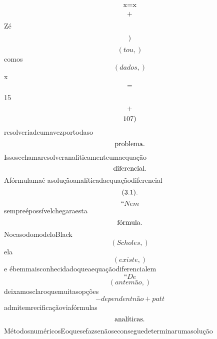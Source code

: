 \documentclass{article}
\begin{document}
\begin{equation}
$x=x$
\end{equation}\begin{equation}
$+$
\end{equation}Zé\begin{equation}
$)$
\end{equation}\begin{equation}
\left( tou,\right)
\end{equation}comos\begin{equation}
\left( dados,\right)
\end{equation}x\begin{equation}
$=$
\end{equation}15\begin{equation}
$+$
\end{equation}\begin{equation}
$107)$
\end{equation}resolveriadeumavezportodaso\begin{equation}
$problema.$
\end{equation}Issosechamaresolveranaliticamenteumaequação\begin{equation}
$diferencial.$
\end{equation}Afórmulamaé asoluçãoanalíticadaequaçãodiferencial\begin{equation}
$(3.1).$
\end{equation}\begin{equation}
“Nem
\end{equation}sempreépossívelchegaraesta\begin{equation}
$fórmula.$
\end{equation}NocasodomodeloBlack\begin{equation}
\left( Scholes,\right)
\end{equation}ela\begin{equation}
\left( existe,\right)
\end{equation}e ébemmaisconhecidadoqueaequaçãodiferencialem\begin{equation}
“De
\end{equation}\begin{equation}
\left( antemão,\right)
\end{equation}deixamosclaroquemuitasopções\begin{equation}
- dependentnão + patt
\end{equation}admitemrecificaçãoviafórmulas\begin{equation}
$analíticas.$
\end{equation}MétodosnuméricosEoquesefazsenãoseconseguedeterminarumasolução\begin{equation}

\end{equation}
\end{document}
